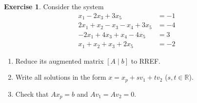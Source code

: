 \documentclass[12pt]{article}
\newcommand{\R}{\mathbb R}
\theoremstyle{definition}
\newtheorem{exercise}{Exercise}
\begin{document}
\begin{exercise}\label{r2-dr-general}
Consider the system
\[
\begin{aligned}
x_1-2x_3+3x_5&=-1\\
2x_1+x_2-x_3-x_4+3x_5&=-4\\
-2x_1+4x_3+x_4-4x_5&=3\\
x_1+x_2+x_3+2x_5&=-2
\end{aligned}
\]
\begin{enumerate}
\item Reduce its augmented matrix \([A\mid b]\) to RREF.
\item Write all solutions in the form \(x=x_p+sv_1+tv_2\) (\(s,t\in\R\)).
\item Check that \(Ax_p=b\) and \(Av_1=Av_2=0\).
\end{enumerate}
\end{exercise}
\end{document}

